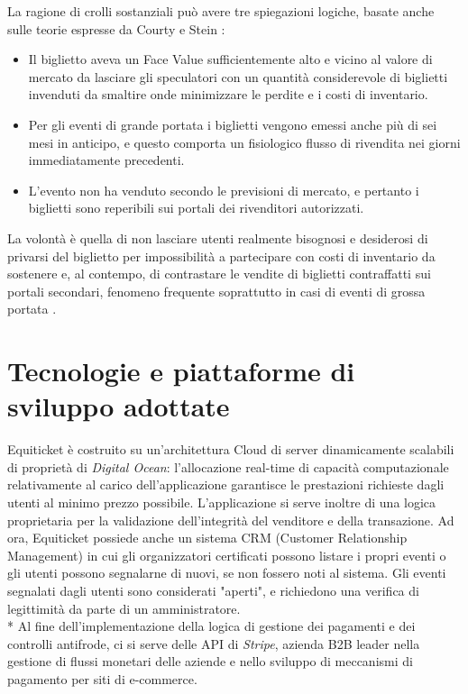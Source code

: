 La ragione di crolli sostanziali può avere tre spiegazioni logiche, basate anche sulle teorie espresse da Courty e Stein \cite{courty2014pricing, stein2014will}:
\begin{itemize}
\item Il biglietto aveva un Face Value sufficientemente alto e vicino al valore di mercato da lasciare gli speculatori con un quantità considerevole di biglietti invenduti da smaltire onde minimizzare le perdite e i costi di inventario.
\item Per gli eventi di grande portata i biglietti vengono emessi anche più di sei mesi in anticipo, e questo comporta un fisiologico flusso di rivendita nei giorni immediatamente precedenti. 
\item L'evento non ha venduto secondo le previsioni di mercato, e pertanto i biglietti sono reperibili sui portali dei rivenditori autorizzati. 
\end{itemize}
La volontà è quella di non lasciare utenti realmente bisognosi e desiderosi di privarsi del biglietto per impossibilità a partecipare con costi di inventario da sostenere e, al contempo, di contrastare le vendite di biglietti contraffatti sui portali secondari, fenomeno frequente soprattutto in casi di eventi di grossa portata \cite{phdthesis}.
\section{Tecnologie e piattaforme di sviluppo adottate} \label{sec:techno}
Equiticket è costruito su un'architettura Cloud di server dinamicamente scalabili di proprietà di \textit{Digital Ocean}: l'allocazione real-time di capacità computazionale relativamente al carico dell'applicazione garantisce le prestazioni richieste dagli utenti al minimo prezzo possibile.  
L'applicazione si serve inoltre di una logica proprietaria per la validazione dell'integrità del venditore e della transazione. Ad ora, Equiticket possiede anche un sistema CRM (Customer Relationship Management) in cui gli organizzatori certificati possono listare i propri eventi o gli utenti possono segnalarne di nuovi, se non fossero noti al sistema. Gli eventi segnalati dagli utenti sono considerati "aperti", e richiedono una verifica di legittimità da parte di un amministratore. \\*
Al fine dell'implementazione della logica di gestione dei pagamenti e dei controlli antifrode, ci si serve delle API di \textit{Stripe}, azienda B2B leader nella gestione di flussi monetari delle aziende e nello sviluppo di meccanismi di pagamento per siti di e-commerce. 
